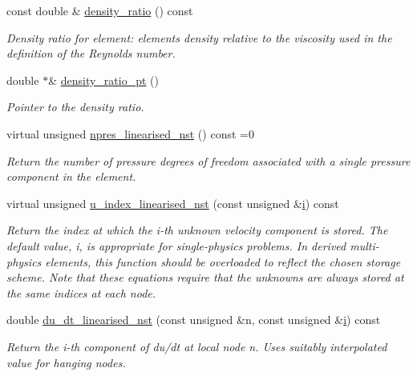 \begin{DoxyCompactItemize}
const double \& \hyperlink{classoomph_1_1LinearisedNavierStokesEquations_af083925ee7128441ddc8b412a35fcb14}{density\+\_\+ratio} () const
\begin{DoxyCompactList}\small\item\em Density ratio for element\+: element\textquotesingle{}s density relative to the viscosity used in the definition of the Reynolds number. \end{DoxyCompactList}\item 
double $\ast$\& \hyperlink{classoomph_1_1LinearisedNavierStokesEquations_a4b08ed0863cbe6a7d4420e555decc0a2}{density\+\_\+ratio\+\_\+pt} ()
\begin{DoxyCompactList}\small\item\em Pointer to the density ratio. \end{DoxyCompactList}\item 
virtual unsigned \hyperlink{classoomph_1_1LinearisedNavierStokesEquations_a2dbceef603d7e72bd709643107d2e975}{npres\+\_\+linearised\+\_\+nst} () const =0
\begin{DoxyCompactList}\small\item\em Return the number of pressure degrees of freedom associated with a single pressure component in the element. \end{DoxyCompactList}\item 
virtual unsigned \hyperlink{classoomph_1_1LinearisedNavierStokesEquations_a051bd3799c25d88c9b840f399cba6334}{u\+\_\+index\+\_\+linearised\+\_\+nst} (const unsigned \&\hyperlink{cfortran_8h_adb50e893b86b3e55e751a42eab3cba82}{i}) const
\begin{DoxyCompactList}\small\item\em Return the index at which the i-\/th unknown velocity component is stored. The default value, i, is appropriate for single-\/physics problems. In derived multi-\/physics elements, this function should be overloaded to reflect the chosen storage scheme. Note that these equations require that the unknowns are always stored at the same indices at each node. \end{DoxyCompactList}\item 
double \hyperlink{classoomph_1_1LinearisedNavierStokesEquations_a66bb2c6c61f3922d8aa05cce128d1bd1}{du\+\_\+dt\+\_\+linearised\+\_\+nst} (const unsigned \&n, const unsigned \&\hyperlink{cfortran_8h_adb50e893b86b3e55e751a42eab3cba82}{i}) const
\begin{DoxyCompactList}\small\item\em Return the i-\/th component of du/dt at local node n. Uses suitably interpolated value for hanging nodes. \end{DoxyCompactList}\item 

\end{DoxyCompactItemize}
